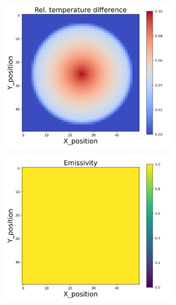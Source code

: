 \begin{figure}[htbp]
\begin{minipage}{\textwidth}
\begin{subfigure}{0.325\textwidth}
            \includegraphics[width=\textwidth]{figures/raw_data/21/T3500/exp/T_bias.jpg}
        \end{subfigure}
        \begin{subfigure}{0.325\textwidth}
            \centering
            \includegraphics[width=\textwidth]{figures/raw_data/21/T3500/exp/emi_cal.jpg}
        \end{subfigure}
    \end{minipage}\\

\end{figure}
